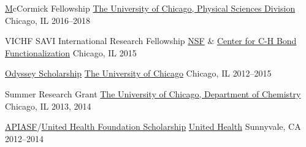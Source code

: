 


\begin{cvhonors}

	\cvhonor
		{\href{https://chemistry.uchicago.edu/phd-financial-support}McCormick Fellowship} %
		{\href{https://physical-sciences.uchicago.edu/}{The University of Chicago, Physical Sciences Division}} %
		{Chicago, IL} %
		{2016--2018} %
   
	\cvhonor
		{VICHF SAVI International Research Fellowship} %
		{\href{https://www.nsf.gov/awardsearch/showAward?AWD_ID=1205646}{NSF} \& \href{http://nsf-cchf.com/vichf/2015-cohort/}{Center for C-H Bond Functionalization}} %
		{Chicago, IL} %
		{2015} %
	
		
	\cvhonor
		{\href{https://financialaid.uchicago.edu/undergraduate/types-aid/scholarships/odyssey-scholarships}{Odyssey Scholarship}} %
		{\href{https://www.uchicago.edu}{The University of Chicago}} %
		{Chicago, IL} %
		{2012--2015} %
	
	\cvhonor
		{Summer Research Grant} %
		{\href{https://chemistry.uchicago.edu}{The University of Chicago, Department of Chemistry}} %
		{Chicago, IL} %
		{2013, 2014} %

	\cvhonor
		{\href{http://www.apiasf.org}{APIASF}/\href{http://www.unitedhealthgroup.com}{United Health Foundation Scholarship}} %
		{\href{http://www.unitedhealthgroup.com/SocialResponsibility/Partners/DiverseScholars.aspx}{United Health}} %
		{Sunnyvale, CA} %
		{2012--2014} %
		

\end{cvhonors}
